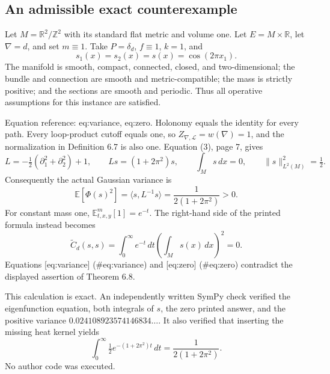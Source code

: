 \documentclass[10pt]{article}
\begin{document}
\subsection*{An admissible exact counterexample}
Let \(M=\mathbb R^2/\mathbb Z^2\) with its standard flat metric and volume one. Let \(E=M\times\mathbb R\), let \(\nabla=d\), and set \(m\equiv1\). Take \(P=\delta_d\), \(f\equiv1\), \(k=1\), and \[s_1(x)=s_2(x)=s(x)=\cos(2\pi x_1).\] The manifold is smooth, compact, connected, closed, and two-dimensional; the bundle and connection are smooth and metric-compatible; the mass is strictly positive; and the sections are smooth and periodic. Thus all operative assumptions for this instance are satisfied.\par
Equation reference: eq:variance, eq:zero. Holonomy equals the identity for every path. Every loop-product cutoff equals one, so \(Z_{\nabla,\mathcal L}=w(\nabla)=1\), and the normalization in Definition 6.7 is also one. Equation (3), page 7, gives \[L=-\tfrac12(\partial_1^2+\partial_2^2)+1,\qquad
 Ls=(1+2\pi^2)s,\qquad
 \int_M s\,dx=0,\qquad \|s\|_{L^2(M)}^2=\tfrac12.\] Consequently the actual Gaussian variance is \[
 \mathbb E[\Phi(s)^2]=\langle s,L^{-1}s\rangle
 =\frac{1}{2(1+2\pi^2)}>0.\] For constant mass one, \(\mathbb E^m_{t,x,y}[1]=e^{-t}\). The right-hand side of the printed formula instead becomes \[
 \widetilde C_d(s,s)
 =\int_0^\infty e^{-t}\,dt
   \left(\int_M s(x)\,dx\right)^2=0.\] Equations [eq:variance] (\#eq:variance) and [eq:zero] (\#eq:zero) contradict the displayed assertion of Theorem 6.8.\par
This calculation is exact. An independently written SymPy check verified the eigenfunction equation, both integrals of \(s\), the zero printed answer, and the positive variance \(0.024108923574146834\ldots\). It also verified that inserting the missing heat kernel yields \[\int_0^\infty \tfrac12 e^{-(1+2\pi^2)t}\,dt
 =\frac{1}{2(1+2\pi^2)}.\] No author code was executed.\par
\end{document}
